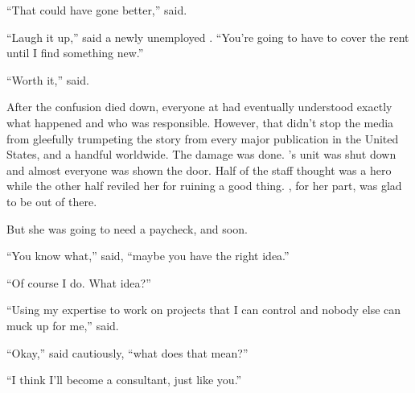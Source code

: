 \sectionBreak{}

``That could have gone better,'' {\sidetag} said.

``Laugh it up,'' said a newly unemployed {\protag}. ``You're going to have to cover the rent until I find something new.''

``Worth it,'' {\sidetag} said.

After the confusion died down, everyone at \energyCompany{} had eventually understood exactly what happened and who was responsible. However, that didn't stop the media from gleefully trumpeting the story from every major publication in the United States, and a handful worldwide. The damage was done. {\protag}'s unit was shut down and almost everyone was shown the door. Half of the staff thought {\protag} was a hero while the other half reviled her for ruining a good thing. {\protag}, for her part, was glad to be out of there.

But she was going to need a paycheck, and soon.

``You know what,'' {\protag} said, ``maybe you have the right idea.''

``Of course I do. What idea?''

``Using my expertise to work on projects that I can control and nobody else can muck up for me,'' {\protag} said.

``Okay,'' {\sidetag} said cautiously, ``what does that mean?''

``I think I'll become a consultant, just like you.''
